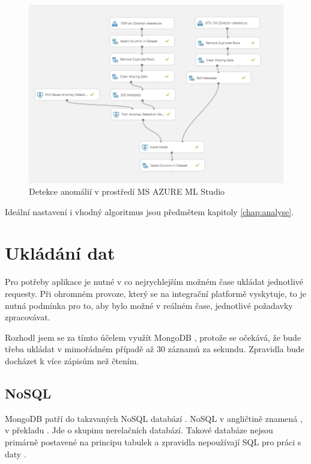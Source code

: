 \documentclass[thesis=M,czech]{FITthesis}[2012/10/20]
\newcommand{\tmpframe}[1]{\fbox{#1}}
\renewcommand{\tmpframe}[1]{#1}
\begin{document}
		\begin{figure}[htb]\centering
			\tmpframe{\includegraphics[width=\textwidth]{./img/azureTrainingAnomaly}}	
			\caption{Detekce anomálií v prostředí MS AZURE ML Studio}
			\label{fig:anomaly_detection_azure}
		\end{figure}
		
		Ideální nastavení i vhodný algoritmus jsou předmětem kapitoly \ref{chap:analyse}.
		
	\section{Ukládání dat}
	\label{sec:data_storing}
		Pro potřeby aplikace je nutné v co nejrychlejším možném čase ukládat jednotlivé requesty. Při ohromném provoze, který se na integrační platformě vyskytuje, to je nutná podmínka pro to, aby bylo možné v reálném čase, jednotlivé požadavky zpracovávat.

		Rozhodl jsem se za tímto účelem využít MongoDB \cite{mongoDB}, protože se očekává, že bude třeba ukládat v mimořádném případě až 30 záznamů za sekundu. Zpravidla bude docházet k více zápisům než čtením.

		\subsection{NoSQL}
			MongoDB patří do takzvaných NoSQL databází \cite{mongoDB}. NoSQL v angličtině znamená  \cite{Moniruzzaman_2013}, v překladu . Jde o skupinu nerelačních databází. Takové databáze nejsou primárně postavené na principu tabulek a zpravidla nepoužívají SQL pro práci s daty \cite{Moniruzzaman_2013}.
\end{document}
